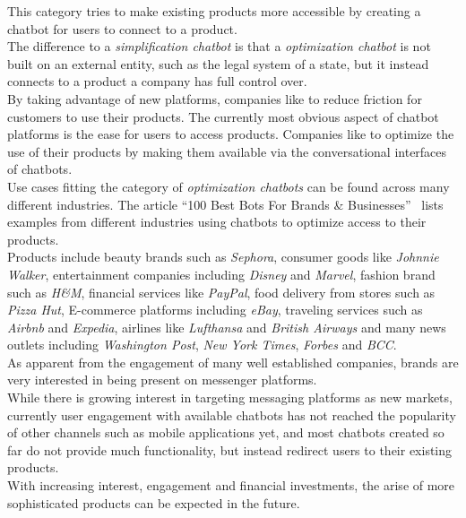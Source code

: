This category tries to make existing products more accessible by creating a chatbot for users to connect to a product.
\\
The difference to a \emph{simplification chatbot} is that a \emph{optimization chatbot} is not built on an external entity, such as the legal system of a state, but it instead connects to a product a company has full control over.
\\
By taking advantage of new platforms, companies like to reduce friction for customers to use their products.
The currently most obvious aspect of chatbot platforms is the ease for users to access products.
Companies like to optimize the use of their products by making them available via the conversational interfaces of chatbots.
\\

Use cases fitting the category of \emph{optimization chatbots} can be found across many different industries.
The article ``100 Best Bots For Brands \& Businesses''~\cite{topbots} lists examples from different industries using chatbots to optimize access to their products.
\\
Products include beauty brands such as \emph{Sephora}, consumer goods like \emph{Johnnie Walker}, entertainment companies including \emph{Disney} and \emph{Marvel}, fashion brand such as \emph{H\&M}, financial services like \emph{PayPal}, food delivery from stores such as \emph{Pizza Hut}, E-commerce platforms including \emph{eBay}, traveling services such as \emph{Airbnb} and \emph{Expedia}, airlines like \emph{Lufthansa} and \emph{British Airways} and many news outlets including \emph{Washington Post}, \emph{New York Times}, \emph{Forbes} and \emph{BCC}.
\\


As apparent from the engagement of many well established companies, brands are very interested in being present on messenger platforms.
\\

While there is growing interest in targeting messaging platforms as new markets, currently user engagement with available chatbots has not reached the popularity of other channels such as mobile applications yet,
and most chatbots created so far do not provide much functionality, but instead redirect users to their existing products.
\\

With increasing interest, engagement and financial investments, the arise of more sophisticated products can be expected in the future.
